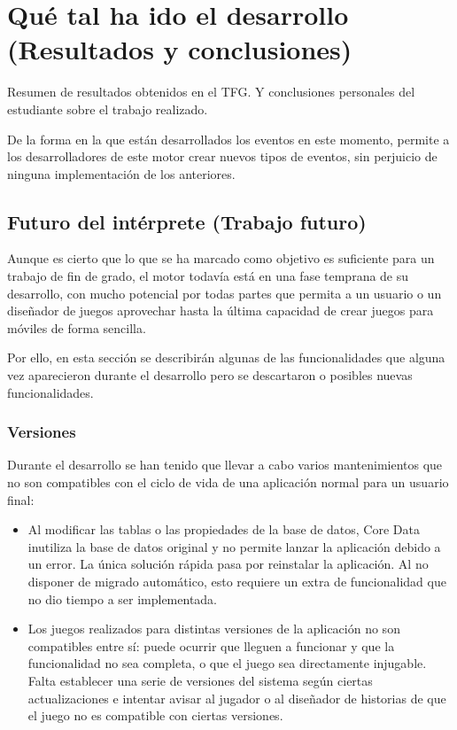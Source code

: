 \chapter{Qué tal ha ido el desarrollo (Resultados y conclusiones)}
Resumen de resultados obtenidos en el TFG. Y conclusiones personales del estudiante sobre el trabajo realizado.

De la forma en la que están desarrollados los eventos en este momento, permite a los desarrolladores de este motor crear nuevos tipos de eventos, sin perjuicio de ninguna implementación de los anteriores.

\section{Futuro del intérprete (Trabajo futuro)}
Aunque es cierto que lo que se ha marcado como objetivo es suficiente para un trabajo de fin de grado, el motor todavía está en una fase temprana de su desarrollo, con mucho potencial por todas partes que permita a un usuario o un diseñador de juegos aprovechar hasta la última capacidad de crear juegos para móviles de forma sencilla.

Por ello, en esta sección se describirán algunas de las funcionalidades que alguna vez aparecieron durante el desarrollo pero se descartaron o posibles nuevas funcionalidades.



\subsection{Versiones}
Durante el desarrollo se han tenido que llevar a cabo varios mantenimientos que no son compatibles con el ciclo de vida de una aplicación normal para un usuario final:

\begin{itemize}
	\item Al modificar las tablas o las propiedades de la base de datos, Core Data inutiliza la base de datos original y no permite lanzar la aplicación debido a un error. La única solución rápida pasa por reinstalar la aplicación. Al no disponer de migrado automático, esto requiere un extra de funcionalidad que no dio tiempo a ser implementada. 
	\item Los juegos realizados para distintas versiones de la aplicación no son compatibles entre sí: puede ocurrir que lleguen a funcionar y que la funcionalidad no sea completa, o que el juego sea directamente injugable. Falta establecer una serie de versiones del sistema según  ciertas actualizaciones e intentar avisar al jugador o al diseñador de historias de que el juego no es compatible con ciertas versiones.
\end{itemize}

